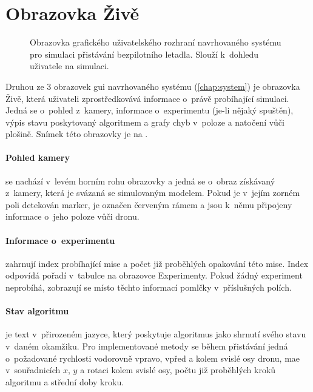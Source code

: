     \section{Obrazovka Živě} \label{sec:zive}
        \begin{figure}
            \centering
            
            \caption[GUI: Obrazovka ]{Obrazovka  grafického uživatelského rozhraní navrhovaného systému pro simulaci přistávání bezpilotního letadla. Slouží k~dohledu uživatele na simulaci.}
            \label{fig:tabZive}
        \end{figure}
        Druhou ze 3 obrazovek \acrshort{gui} navrhovaného systému (\cref{chap:system}) je obrazovka Živě, která uživateli zprostředkovává informace o~právě probíhající simulaci. Jedná se o~pohled z~kamery, informace o~experimentu (je-li nějaký spuštěn), výpis stavu poskytovaný algoritmem a grafy chyb v~poloze a natočení vůči plošině. Snímek této obrazovky je na .

        \paragraph{ Pohled kamery} se nachází v~levém horním rohu obrazovky a jedná se o~obraz získávaný z~kamery, která je svázaná se simulovaným modelem. Pokud je v~jejím zorném poli detekován marker, je označen červeným rámem a jsou k~němu připojeny informace o~jeho poloze vůči dronu.

        \paragraph{ Informace o~experimentu} zahrnují index probíhající mise a počet již proběhlých opakování této mise. Index odpovídá pořadí v~tabulce na obrazovce Experimenty. Pokud žádný experiment neprobíhá, zobrazují se místo těchto informací pomlčky v~příslušných polích.

        \paragraph{ Stav algoritmu} je text v~přirozeném jazyce, který poskytuje algoritmus jako shrnutí svého stavu v~daném okamžiku. Pro implementované metody se během přistávání jedná o~požadované rychlosti vodorovně vpravo, vpřed a kolem svislé osy dronu, \acrshort{mae} v~souřadnicích $x$, $y$ a rotaci kolem svislé osy, počtu již proběhlých kroků algoritmu a střední doby kroku.

